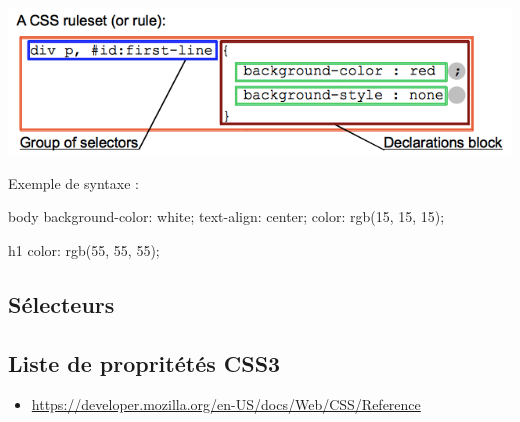 \documentclass[10pt, landscape, french]{article}
\newenvironment{codeCSS}[1]{%
#1 :  %
\minted{CSS}%
}{%
\endminted%
}
\begin{document}
\begin{multicols}{3}
\begin{center}
 \includegraphics[width=0.9\linewidth]{css_syntax-ruleset.png}
\end{center}    

\begin{codeCSS}{Exemple de syntaxe}
body {
    background-color: white;
    text-align: center;
    color: rgb(15, 15, 15);
}

h1 {
    color: rgb(55, 55, 55);
}
\end{codeCSS}

\subsection{Sélecteurs}
 
\subsection{Liste de propritétés CSS3} 
\begin{itemize}
	\item \url{https://developer.mozilla.org/en-US/docs/Web/CSS/Reference}
\end{itemize}    
    
\end{multicols}
\end{document}
